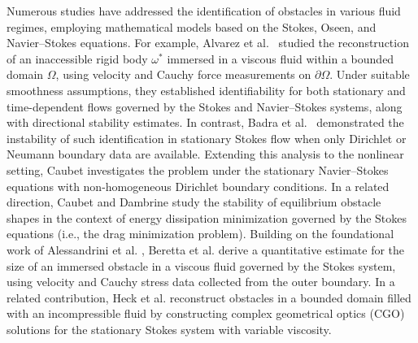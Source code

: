 \documentclass[a4paper,12pt,reqno,natbib]{amsart}
\begin{document}
Numerous studies have addressed the identification of obstacles in various fluid regimes, employing mathematical models based on the Stokes, Oseen, and Navier–Stokes equations. For example, Alvarez et al.~\cite{AlvarezIPPIP2005} studied the reconstruction of an inaccessible rigid body $\omega^*$ immersed in a viscous fluid within a bounded domain $\Omega$, using velocity and Cauchy force measurements on $\partial\Omega$. Under suitable smoothness assumptions, they established identifiability for both stationary and time-dependent flows governed by the Stokes and Navier–Stokes systems, along with directional stability estimates. In contrast, Badra et al.~\cite{badra2011detecting} demonstrated the instability of such identification in stationary Stokes flow when only Dirichlet or Neumann boundary data are available.  Extending this analysis to the nonlinear setting, Caubet \cite{caubet2013instability} investigates the problem under the stationary Navier--Stokes equations with non-homogeneous Dirichlet boundary conditions. In a related direction, Caubet and Dambrine \cite{caubet2013stability144} study the stability of equilibrium obstacle shapes in the context of energy dissipation minimization governed by the Stokes equations (i.e., the drag minimization problem).
Building on the foundational work of Alessandrini et al. \cite{alessandrini2002detecting}, Beretta et al. \cite{EE11} derive a quantitative estimate for the size of an immersed obstacle in a viscous fluid governed by the  Stokes system, using velocity and Cauchy stress data collected from the outer boundary. In a related contribution, Heck et al. \cite{heck2007reconstruction} reconstruct obstacles in a bounded domain filled with an incompressible fluid by constructing complex geometrical optics (CGO) solutions for the stationary Stokes system with variable viscosity.
\end{document}
